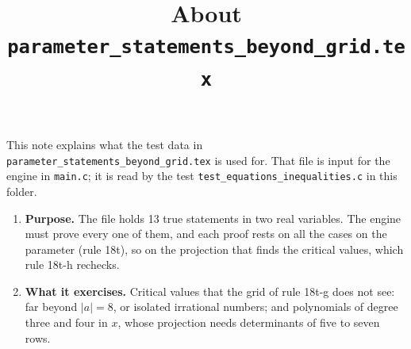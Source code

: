 \documentclass[11pt,a4paper]{article}
\title{About \texttt{parameter\_statements\_beyond\_grid.tex}}
\author{}
\date{}
\begin{document}
\maketitle
This note explains what the test data in \texttt{parameter\_statements\_beyond\_grid.tex} is used for. That file is input for the engine in \texttt{main.c}; it is read by the test \texttt{test\_equations\_inequalities.c} in this folder.

\begin{enumerate}
\item \textbf{Purpose.} The file holds 13 true statements in two real variables. The engine must prove every one of them, and each proof rests on all the cases on the parameter (rule 18t), so on the projection that finds the critical values, which rule 18t-h rechecks.

\item \textbf{What it exercises.} Critical values that the grid of rule 18t-g does not see: far beyond $|a| = 8$, or isolated irrational numbers; and polynomials of degree three and four in $x$, whose projection needs determinants of five to seven rows.


\end{enumerate}
\end{document}
